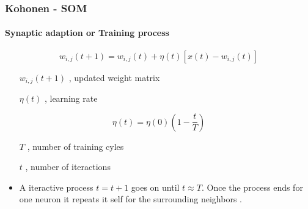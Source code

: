 \documentclass[aspectratio=10]{beamer} %
\begin{document}
\begin{frame}
 \frametitle{Kohonen - SOM}
 \framesubtitle{Synaptic adaption or Training process}
%
\begin{equation}
w_{i,j}(t+1)=w_{i,j}(t)+\eta(t)[x(t)-w_{i,j}(t)] \nonumber
\label{eq2}
\end{equation}  

\pause

\begin{itemize}
	\centering
	\item[$w_{i,j}(t+1)$],  updated weight matrix 
	\item[$\eta(t)$], learning rate
\end{itemize}

\begin{equation}
\eta(t)=\eta(0)    ( 1 -  \frac{t}{T}  ) \nonumber
\label{eq3}
\end{equation}  

\begin{itemize}
	\centering
	\item[$T$], number of training cyles
	\pause
	\item[$t$], number of iteractions
	\pause
	\item A iteractive process $t=t+1$ goes on until $t \approx  T$. Once the process ends for one neuron it repeats it self for the surrounding neighbors \citep{YANG2009,Yan2014}.
\end{itemize}


\end{frame}
\end{document}
